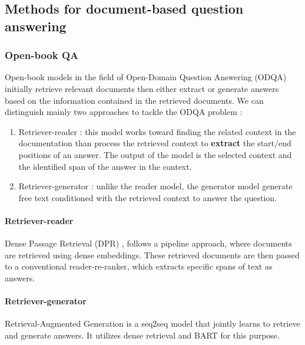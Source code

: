 \documentclass[a4paper,12pt]{article}
\begin{document}
\subsection{Methods for document-based question answering}
\subsubsection{Open-book QA}
Open-book models in the field of Open-Domain Question Answering (ODQA) initially retrieve relevant documents then either extract or generate answers based on the information contained in the retrieved documents. We can distinguish mainly two approaches to tackle the ODQA problem :

\begin{enumerate}
	\item Retriever-reader : this model works toward finding the related context in the documentation than process the retrieved context to \textbf{extract} the start/end positions of an answer. The output of the model is the selected context and the identified span of the answer in the context. 
	\item Retriever-generator : unlike the reader model, the generator model generate free text conditioned with the retrieved context to answer the question.
\end{enumerate}

\paragraph{Retriever-reader}
Dense Passage Retrieval (DPR) \cite{dpr}, follows a pipeline approach, where documents are retrieved using dense embeddings. These retrieved documents are then passed to a conventional reader-re-ranker, which extracts specific spans of text as answers.

\paragraph{Retriever-generator}
Retrieval-Augmented Generation \cite{rag} is a seq2seq model that jointly learns to retrieve and generate answers. It utilizes dense retrieval and BART \cite{bart} for this purpose.
\end{document}
